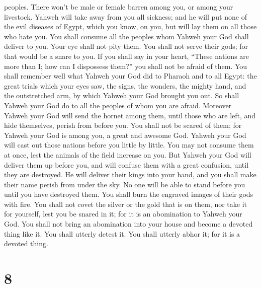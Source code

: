 peoples. There won't be male or female barren among you, or among your
livestock.  Yahweh will take away from you all sickness;
and he will put none of the evil diseases of Egypt, which you know, on
you, but will lay them on all those who hate you.  You
shall consume all the peoples whom Yahweh your God shall deliver to you.
Your eye shall not pity them. You shall not serve their gods; for that
would be a snare to you.  If you shall say in your heart,
``These nations are more than I; how can I dispossess them?''
 you shall not be afraid of them. You shall remember well
what Yahweh your God did to Pharaoh and to all Egypt: 
the great trials which your eyes saw, the signs, the wonders, the mighty
hand, and the outstretched arm, by which Yahweh your God brought you
out. So shall Yahweh your God do to all the peoples of whom you are
afraid.  Moreover Yahweh your God will send the hornet
among them, until those who are left, and hide themselves, perish from
before you.  You shall not be scared of them; for Yahweh
your God is among you, a great and awesome God.  Yahweh
your God will cast out those nations before you little by little. You
may not consume them at once, lest the animals of the field increase on
you.  But Yahweh your God will deliver them up before
you, and will confuse them with a great confusion, until they are
destroyed.  He will deliver their kings into your hand,
and you shall make their name perish from under the sky. No one will be
able to stand before you until you have destroyed them. 
You shall burn the engraved images of their gods with fire. You shall
not covet the silver or the gold that is on them, nor take it for
yourself, lest you be snared in it; for it is an abomination to Yahweh
your God.  You shall not bring an abomination into your
house and become a devoted thing like it. You shall utterly detest it.
You shall utterly abhor it; for it is a devoted thing.

\hypertarget{section-7}{%
\section{8}\label{section-7}}

